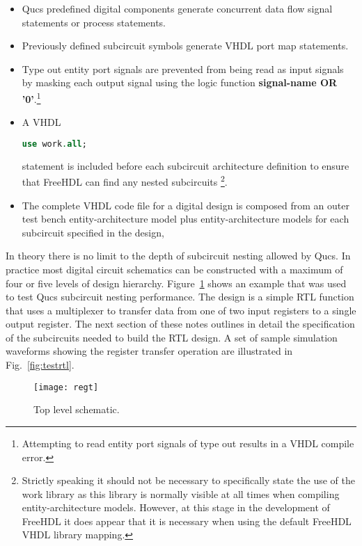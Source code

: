 
\begin{itemize}
\item
Qucs predefined digital components generate concurrent data flow
signal statements or process statements.
\item
Previously defined subcircuit symbols generate VHDL port map
statements.
\item
 Type out entity port signals are prevented from being read as input
 signals by masking each output signal using the logic
 function  \textbf{signal-name OR '0'}.\footnote{Attempting to read
 entity port signals of type out results in a VHDL compile error. }
\item
 A VHDL \begin{lstlisting}[language=VHDL]
use work.all; \end{lstlisting}
statement is included before each subcircuit architecture definition
to ensure that FreeHDL can find any nested subcircuits
\footnote{Strictly speaking it should not be necessary to specifically
state the use of the work library as this library is normally visible
at all times when compiling entity-architecture models.  However, at
this stage in the development of FreeHDL it does appear that it is
necessary when using the default FreeHDL VHDL library mapping.}.
\item
The complete VHDL code file for a digital design is composed from an
outer test bench entity-architecture model plus entity-architecture
models for each subcircuit specified in the design,
\end{itemize}


In theory there is no limit to the depth of subcircuit nesting allowed
by Qucs.  In practice most digital circuit schematics can be
constructed with a maximum of four or five levels of design hierarchy.
Figure~\ref{fig:regt} shows an example that was used to test Qucs
subcircuit nesting performance.  The design is a simple RTL function
that uses a multiplexer to transfer data from one of two input
registers to a single output register.  The next section of these
notes outlines in detail the specification of the subcircuits needed
to build the RTL design.  A set of sample simulation waveforms showing the 
register transfer operation are illustrated in Fig.~\ref{fig:testrtl}.
\newpage 
{}

\begin{figure}[ht]
  \centering
  \texttt{[image: regt]}
  \caption{Top level schematic.}
  \label{fig:regt}
\end{figure} 
\FloatBarrier

